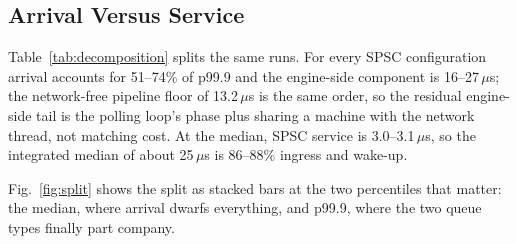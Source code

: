 \documentclass[conference]{IEEEtran}
\newcommand{\us}{\,$\mu$s}
\begin{document}
\subsection{Arrival Versus Service}
Table~\ref{tab:decomposition} splits the same runs. For every SPSC configuration
arrival accounts for 51--74\% of p99.9 and the engine-side component is
16--27\us; the network-free pipeline floor of 13.2\us{} is the same order, so the
residual engine-side tail is the polling loop's phase plus sharing a machine with
the network thread, not matching cost. At the median, SPSC service is
3.0--3.1\us, so the integrated median of about 25\us{} is 86--88\% ingress and
wake-up.

Fig.~\ref{fig:split} shows the split as stacked bars at the two percentiles that
matter: the median, where arrival dwarfs everything, and p99.9, where the two
queue types finally part company.
\end{document}
